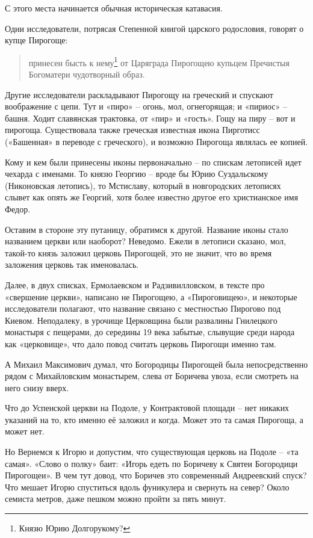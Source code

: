 С этого места начинается обычная историческая катавасия. 

Одни исследователи, потрясая Степенной книгой царского родословия, говорят о купце Пирогоще:

\begin{quotation}
принесен бысть к нему\footnote{Князю Юрию Долгорукому?} от Царяграда Пирогощею купьцем Пречистыя Богоматери чудотворный образ.
\end{quotation}

Другие исследователи раскладывают Пирогощу на греческий и спускают воображение с цепи. Тут и «пиро» – огонь, мол, огнегорящая; и «пириос» – башня. Ходит славянская трактовка, от «пир» и «гость». Гощу на пиру – вот и пирогоща. Существовала также греческая известная икона Пирготисс («Башенная» в переводе с греческого), и возможно Пирогоща являлась ее копией.

Кому и кем были принесены иконы первоначально – по спискам летописей идет чехарда с именами. То князю Георгию – вроде бы Юрию Суздальскому (Никоновская летопись), то Мстиславу, который в новгородских летописях слывет как опять же Георгий, хотя более известно другое его христианское имя Федор.

Оставим в стороне эту путаницу, обратимся к другой. Название иконы стало названием церкви или наоборот? Неведомо. Ежели в летописи сказано, мол, такой-то князь заложил церковь Пирогощей, это не значит, что во время заложения церковь так именовалась.

Далее, в двух списках, Ермолаевском и Радзивилловском, в тексте про «свершение церкви», написано не Пирогощею, а «Пироговищею», и некоторые исследователи полагают, что название связано с местностью Пирогово под Киевом. Неподалеку, в урочище Церковщина были развалины Гнилецкого монастыря с пещерами, до середины 19 века забытые, слывущие среди народа как «церковище», что дало повод считать церковь Пирогощи именно там. 

А Михаил Максимович думал, что Богородицы Пирогощей была непосредственно рядом с Михайловским монастырем, слева от Боричева увоза, если смотреть на него снизу вверх.

Что до Успенской церкви на Подоле, у Контрактовой площади – нет никаких указаний на то, кто именно её заложил и когда. Может это та самая Пирогоща, а может нет.

Но Вернемся к Игорю и допустим, что существующая церковь на Подоле – «та самая». «Слово о полку» баит: «Игорь едеть по Боричеву к Святеи Богородици Пирогощеи». В чем тут довод, что Боричев это современный Андреевский спуск? Что мешает Игорю спуститься вдоль фуникулера и свернуть на север? Около семиста метров, даже пешком можно пройти за пять минут.

